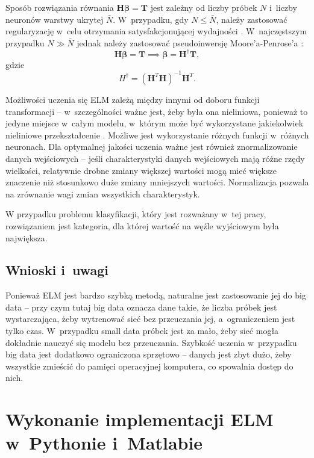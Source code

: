 \documentclass[pl]{minipw} %
\begin{document}
Sposób rozwiązania równania $\bm{H}\bm{\beta}=\bm{T}$ jest zależny od liczby próbek $N$ i~liczby neuronów warstwy ukrytej $\bar{N}$. W~przypadku, gdy $N \leq \bar{N}$, należy zastosować regularyzację w~celu otrzymania satysfakcjonującej wydajności \cite{akusok-hpelm}. W~najczęstszym przypadku $N \gg \bar{N}$ jednak należy zastosować pseudoinwersję Moore'a-Penrose'a \cite{huang-elm-base:ta}:
\begin{equation}
\bm{H}\bm{\beta}=\bm{T} \implies \bm{\beta}=\bm{H}^{\dagger}\bm{T},
\end{equation}
gdzie 
\begin{equation}
{H}^{\dagger} = (\bm{H}^T \bm{H})^{-1}\bm{H}^T.
\end{equation}

Możliwości uczenia się ELM zależą między innymi od doboru funkcji transformacji -- w~szczególności ważne jest, żeby była ona nieliniowa, ponieważ to jedyne miejsce w~całym modelu, w~którym może być wykorzystane jakiekolwiek nieliniowe przekształcenie \cite{akusok-hpelm}. Możliwe jest wykorzystanie różnych funkcji w~różnych neuronach. Dla optymalnej jakości uczenia ważne jest również znormalizowanie danych wejściowych -- jeśli charakterystyki danych wejściowych mają różne rzędy wielkości, relatywnie drobne zmiany większej wartości mogą mieć większe znaczenie niż stosunkowo duże zmiany mniejszych wartości. Normalizacja pozwala na zrównanie wagi zmian wszystkich charakterystyk. \par

W przypadku problemu klasyfikacji, który jest rozważany w~tej pracy, rozwiązaniem jest kategoria, dla której wartość na węźle wyjściowym była największa. 
\section{Wnioski i~uwagi}
Ponieważ ELM jest bardzo szybką metodą, naturalne jest zastosowanie jej do big data -- przy czym tutaj big data oznacza dane takie, że liczba próbek jest wystarczająca, żeby wytrenować sieć bez przeuczania jej, a~ograniczeniem jest tylko czas. W~przypadku small data próbek jest za mało, żeby sieć mogła dokładnie nauczyć się modelu bez przeuczania. Szybkość uczenia w~przypadku big data jest dodatkowo ograniczona sprzętowo -- danych jest zbyt dużo, żeby wszystkie zmieścić do pamięci operacyjnej komputera, co spowalnia dostęp do nich.

\clearpage
\chapter{Wykonanie implementacji ELM w~Pythonie i~Matlabie}
\end{document}
